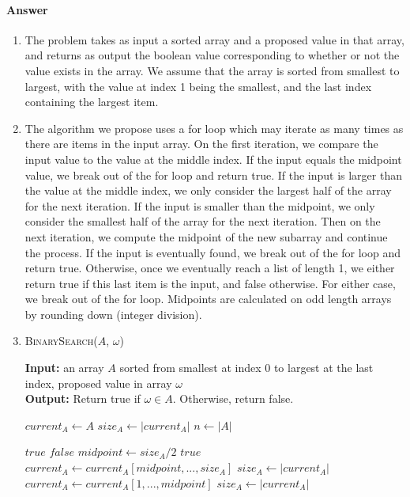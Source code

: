 \documentclass{article}
\begin{document}
\paragraph{Answer}


\begin{enumerate}
	\item The problem takes as input a sorted array and a proposed value in that array, and returns
		as output the boolean value corresponding to whether or not the value exists in the array.
		We assume that the array is sorted from smallest to largest, with the value at index 1
		being the smallest, and the last index containing the largest item.
	\item The algorithm we propose uses a for loop which may iterate as many times as there are items in
		the input array. On the first iteration, we compare the input value to the value at the middle
		index. If the input equals the midpoint value, we break out of the for loop and return true.
		If the input is larger than the value at the middle index, we only consider the largest
		half of the array for the next iteration. If the input is smaller than the midpoint, we only
		consider the smallest half of the array for the next iteration. Then on the next iteration,
		we compute the midpoint of the new subarray and continue the process. If the input is eventually
		found, we break out of the for loop and return true. Otherwise, once we eventually reach
		a list of length 1, we either return true if this last item is the input, and false otherwise.
		For either case, we break out of the for loop. Midpoints are calculated on odd length arrays
		by rounding down (integer division).
        \item
                \begin{algorithm}\caption{\textsc{BinarySearch}($A$, $\omega$)}\label{alg:bs}
                        {\bf Input:} an array $A$ sorted from smallest at index 0 to largest at the last index,
                        proposed value in array $\omega$\\
                        {\bf Output:} Return true if $\omega \in A$. Otherwise, return false.
                \begin{algorithmic}[1]

			\State $current_A \gets A$
                        \State $size_A \gets |current_A|$
			\State $n \gets |A|$

						\State \Return $true$
					\Else
						\State \Return $false$
					\EndIf
				\EndIf
				\State $midpoint \gets size_A/2$
                              		\State \Return $true$
				\EndIf
				\If{$\omega > current_A[midpoint$}
					\State $current_A \gets current_A[midpoint,...,size_A]$
					\State $size_A \gets |current_A|$
					\State $current_A \gets current_A[1,...,midpoint]$
					\State $size_A \gets |current_A|$
				\EndIf
                        \EndWhile


\end{algorithmic}
\end{algorithm}
\end{enumerate}
\end{document}
